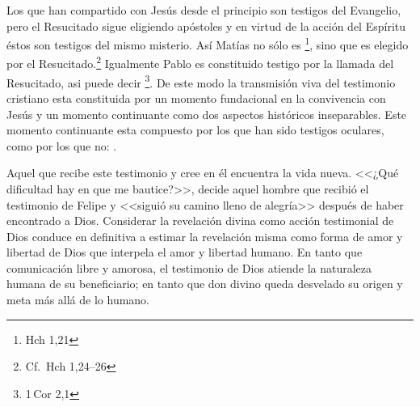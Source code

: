Los que han compartido con Jesús desde el principio son testigos del Evangelio,
pero el Resucitado sigue eligiendo apóstoles y en virtud de la acción del
Espíritu éstos son testigos del mismo misterio.\autocite[Cf.][576]{ninot2009tf}
Así Matías no sólo es \footnote{Hch 1,21}, sino que
es elegido por el Resucitado.\footnote{Cf.~Hch 1,24--26} Igualmente Pablo es
constituido testigo por la llamada del Resucitado, asi puede decir
\footnote{1\,Cor 2,1}. De este modo la transmisión
viva del testimonio cristiano esta constituida por un momento fundacional en la
convivencia con Jesús y un momento continuante como dos aspectos históricos
inseparables.\autocite[Cf.][148]{prades2015testimonio} Este momento continuante
esta compuesto por los que han sido testigos oculares, como por los que no:
.\autocite[148]{prades2015testimonio}

Aquel que recibe este testimonio y cree en él encuentra la vida nueva. <<¿Qué
dificultad hay en que me bautice?>>, decide aquel hombre que recibió el
testimonio de Felipe y <<siguió su camino lleno de alegría>> después de haber
encontrado a Dios. Considerar la revelación divina como acción testimonial de
Dios conduce en definitiva a estimar la revelación misma como forma de amor y
libertad de Dios que interpela el amor y libertad humano. En tanto que
comunicación libre y amorosa, el testimonio de Dios atiende la naturaleza humana
de su beneficiario; en tanto que don divino queda desvelado su origen y meta más
allá de lo humano.\autocite[Cf.][152]{prades2015testimonio}
